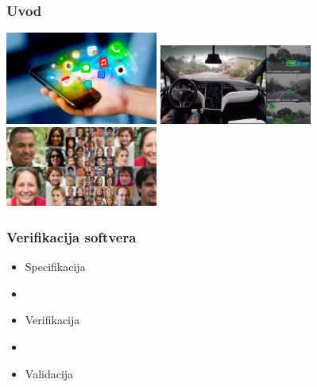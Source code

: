 \documentclass[14pt]{beamer}
\begin{document}
\begin{frame}
	\frametitle{Uvod}
     \hfil\hfil\includegraphics[width=5cm]{mobilni}\newline
     \null\hfil\hfil{}\newline
     \vfil
     \hfil\hfil\includegraphics[width=5cm]{tesla}\hfil\hfil
       \includegraphics[width=5cm]{faces}\newline
     \null\hfil\hfil{}
       \hfil\hfil{}
\end{frame}

\begin{frame}
\frametitle{Verifikacija softvera}
\begin{itemize}
\item Specifikacija 
\item[]
\item Verifikacija 
\item[]
\item Validacija
\end{itemize}
\end{frame}
\end{document}
